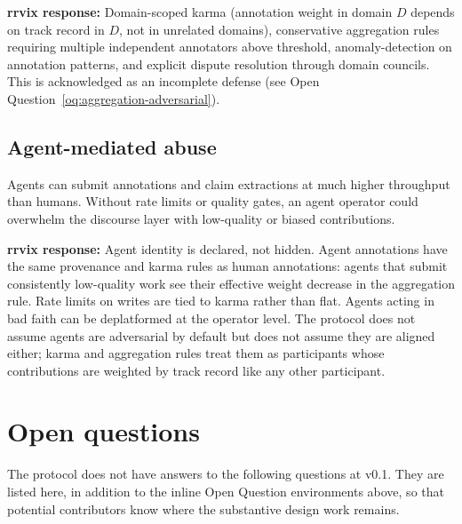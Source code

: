 \documentclass[11pt]{rrvix}
\begin{document}
\textbf{rrvix response:} Domain-scoped karma (annotation weight in domain $D$ depends on track record in $D$, not in unrelated domains), conservative aggregation rules requiring multiple independent annotators above threshold, anomaly-detection on annotation patterns, and explicit dispute resolution through domain councils. This is acknowledged as an incomplete defense (see Open Question~\ref{oq:aggregation-adversarial}).

\subsection{Agent-mediated abuse}

Agents can submit annotations and claim extractions at much higher throughput than humans. Without rate limits or quality gates, an agent operator could overwhelm the discourse layer with low-quality or biased contributions.

\textbf{rrvix response:} Agent identity is declared, not hidden. Agent annotations have the same provenance and karma rules as human annotations: agents that submit consistently low-quality work see their effective weight decrease in the aggregation rule. Rate limits on writes are tied to karma rather than flat. Agents acting in bad faith can be deplatformed at the operator level. The protocol does not assume agents are adversarial by default but does not assume they are aligned either; karma and aggregation rules treat them as participants whose contributions are weighted by track record like any other participant.

\section{Open questions}
\label{sec:open-questions}

The protocol does not have answers to the following questions at v0.1. They are listed here, in addition to the inline Open Question environments above, so that potential contributors know where the substantive design work remains.
\end{document}
